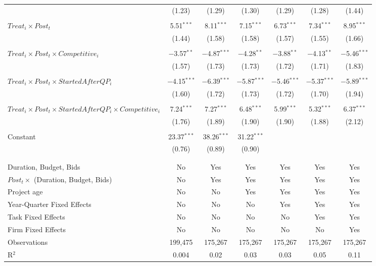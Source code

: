 \documentclass[]{article}
\begin{document}
\begin{table}[H]
\begin{tabular}{@{\extracolsep{-3pt}}lcccccc}
  & (1.23) & (1.29) & (1.30) & (1.29) & (1.28) & (1.44) \\ 
  & & & & & & \\ 
 $Treat_i \times Post_t$ & 5.51$^{***}$ & 8.11$^{***}$ & 7.15$^{***}$ & 6.73$^{***}$ & 7.34$^{***}$ & 8.95$^{***}$ \\ 
  & (1.44) & (1.58) & (1.58) & (1.57) & (1.55) & (1.66) \\ 
  & & & & & & \\ 
 $Treat_i \times Post_t \times Competitive_i$ & $-$3.57$^{**}$ & $-$4.87$^{***}$ & $-$4.28$^{**}$ & $-$3.88$^{**}$ & $-$4.13$^{**}$ & $-$5.46$^{***}$ \\ 
  & (1.57) & (1.73) & (1.73) & (1.72) & (1.71) & (1.83) \\ 
  & & & & & & \\ 
 $Treat_i \times Post_t \times StartedAfterQP_i$ & $-$4.15$^{***}$ & $-$6.39$^{***}$ & $-$5.87$^{***}$ & $-$5.46$^{***}$ & $-$5.37$^{***}$ & $-$5.89$^{***}$ \\ 
  & (1.60) & (1.72) & (1.73) & (1.72) & (1.70) & (1.94) \\ 
  & & & & & & \\ 
 $Treat_i \times Post_t \times StartedAfterQP_i \times Competitive_i$ & 7.24$^{***}$ & 7.27$^{***}$ & 6.48$^{***}$ & 5.99$^{***}$ & 5.32$^{***}$ & 6.37$^{***}$ \\ 
  & (1.76) & (1.89) & (1.90) & (1.90) & (1.88) & (2.12) \\ 
  & & & & & & \\ 
 Constant & 23.37$^{***}$ & 38.26$^{***}$ & 31.22$^{***}$ &  &  &  \\ 
  & (0.76) & (0.89) & (0.90) &  &  &  \\ 
  & & & & & & \\ 
\hline \\[-1.8ex] 
Duration, Budget, Bids & No & Yes & Yes & Yes & Yes & Yes \\ 
$Post_t \times $  (Duration, Budget, Bids) & No & Yes & Yes & Yes & Yes & Yes \\ 
Project age & No & No & Yes & Yes & Yes & Yes \\ 
Year-Quarter Fixed Effects & No & No & No & Yes & Yes & Yes \\ 
Task Fixed Effects & No & No & No & No & Yes & Yes \\ 
Firm Fixed Effects & No & No & No & No & No & Yes \\ 
Observations & 199,475 & 175,267 & 175,267 & 175,267 & 175,267 & 175,267 \\ 
R$^{2}$ & 0.004 & 0.02 & 0.03 & 0.03 & 0.05 & 0.11 \\ 

\end{tabular}
\end{table}
\end{document}
